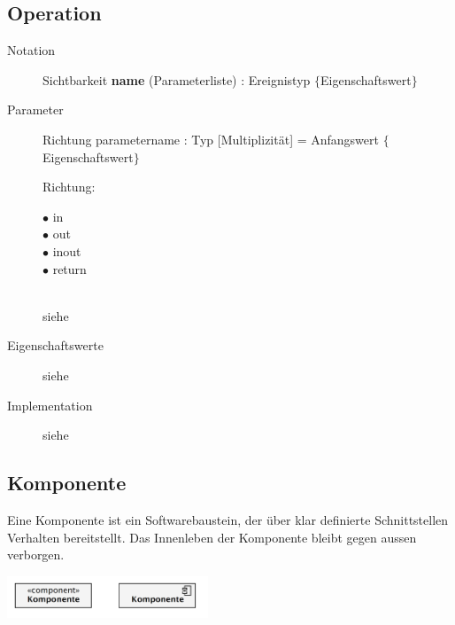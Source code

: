   
\subsection{Operation }
  \begin{description}
    \item[Notation]
      Sichtbarkeit \textbf{name} (Parameterliste) : Ereignistyp $\lbrace$Eigenschaftswert$\rbrace$
    \item[Parameter]
      Richtung parametername : Typ [Multiplizität] = Anfangswert $\lbrace$Eigenschaftswert$\rbrace$ \\
      \parbox[t]{2cm}{Richtung: }
      \parbox[t]{2cm}{$\bullet$ in \\ $\bullet$ out \\ $\bullet$ inout \\ $\bullet$ return} \\
      siehe 
    \item[Eigenschaftswerte]
      siehe 
    \item[Implementation]
      siehe 
  \end{description}
  
\subsection{Komponente }
  \begin{minipage}{12cm}
    Eine Komponente ist ein Softwarebaustein, der über klar definierte Schnittstellen Verhalten bereitstellt.
    Das Innenleben der Komponente bleibt gegen aussen verborgen.
  \end{minipage}
  \begin{minipage}{6cm}
    \includegraphics[width=6cm]{./images/Komponente.png}
  \end{minipage}
  

